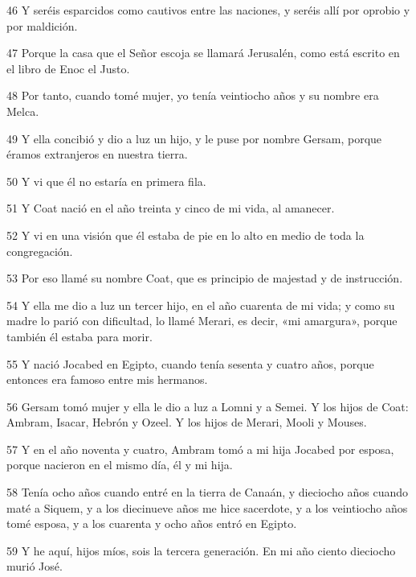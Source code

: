 \par 46 Y seréis esparcidos como cautivos entre las naciones, y seréis allí por oprobio y por maldición.

\par 47 Porque la casa que el Señor escoja se llamará Jerusalén, como está escrito en el libro de Enoc el Justo.

\par 48 Por tanto, cuando tomé mujer, yo tenía veintiocho años y su nombre era Melca.

\par 49 Y ella concibió y dio a luz un hijo, y le puse por nombre Gersam, porque éramos extranjeros en nuestra tierra.

\par 50 Y vi que él no estaría en primera fila.

\par 51 Y Coat nació en el año treinta y cinco de mi vida, al amanecer.

\par 52 Y vi en una visión que él estaba de pie en lo alto en medio de toda la congregación.

\par 53 Por eso llamé su nombre Coat, que es principio de majestad y de instrucción.

\par 54 Y ella me dio a luz un tercer hijo, en el año cuarenta de mi vida; y como su madre lo parió con dificultad, lo llamé Merari, es decir, «mi amargura», porque también él estaba para morir.

\par 55 Y nació Jocabed en Egipto, cuando tenía sesenta y cuatro años, porque entonces era famoso entre mis hermanos.

\par 56 Gersam tomó mujer y ella le dio a luz a Lomni y a Semei. Y los hijos de Coat: Ambram, Isacar, Hebrón y Ozeel. Y los hijos de Merari, Mooli y Mouses.

\par 57 Y en el año noventa y cuatro, Ambram tomó a mi hija Jocabed por esposa, porque nacieron en el mismo día, él y mi hija.

\par 58 Tenía ocho años cuando entré en la tierra de Canaán, y dieciocho años cuando maté a Siquem, y a los diecinueve años me hice sacerdote, y a los veintiocho años tomé esposa, y a los cuarenta y ocho años entró en Egipto.

\par 59 Y he aquí, hijos míos, sois la tercera generación. En mi año ciento dieciocho murió José.

